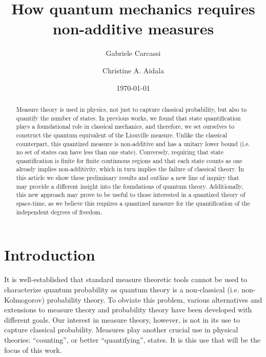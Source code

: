 \documentclass[10pt,twocolumn, nofootinbib]{revtex4-2}
\begin{document}
\title{How quantum mechanics requires non-additive measures}
\author{Gabriele Carcassi}
\author{Christine A. Aidala}

\date{\today}


\begin{abstract}
	Measure theory is used in physics, not just to capture classical probability, but also to quantify the number of states. In previous works, we found that state quantification plays a foundational role in classical mechanics, and therefore, we set ourselves to construct the quantum equivalent of the Liouville measure. Unlike the classical counterpart, this quantized measure is non-additive and has a unitary lower bound (i.e. no set of states can have less than one state). Conversely, requiring that state quantification is finite for finite continuous regions and that each state counts as one already implies non-additivity, which in turn implies the failure of classical theory. In this article we show these preliminary results and outline a new line of inquiry that may provide a different insight into the foundations of quantum theory. Additionally, this new approach may prove to be useful to those interested in a quantized theory of space-time, as we believe this requires a quantized measure for the quantification of the independent degrees of freedom.
\end{abstract}

\maketitle

\section{Introduction}

It is well-established that standard measure theoretic tools cannot be used to characterize quantum probability as quantum theory is a non-classical (i.e. non-Kolmogorov) probability theory. To obviate this problem, various alternatives and extensions to measure theory and probability theory have been developed with different goals.\cite{groenewold1946principles, moyal1949quantum, gleason1957measures, sorkin1994quantum, hamhalter2003quantum, gudder2009quantum, svozil2022extending, monchietti2023measure} Our interest in measure theory, however, is not in its use to capture classical probability. Measures play another crucial use in physical theories: ``counting'', or better ``quantifying'', states. It is this use that will be the focus of this work.
\end{document}
